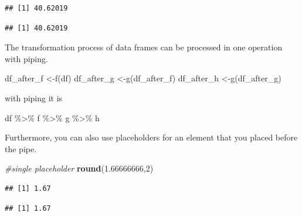 \documentclass[]{report}
\newenvironment{Shaded}{\begin{snugshade}}{\end{snugshade}}
\newcommand{\KeywordTok}[1]{\textcolor[rgb]{0.13,0.29,0.53}{\textbf{#1}}}
\newcommand{\DecValTok}[1]{\textcolor[rgb]{0.00,0.00,0.81}{#1}}
\newcommand{\FloatTok}[1]{\textcolor[rgb]{0.00,0.00,0.81}{#1}}
\newcommand{\StringTok}[1]{\textcolor[rgb]{0.31,0.60,0.02}{#1}}
\newcommand{\CommentTok}[1]{\textcolor[rgb]{0.56,0.35,0.01}{\textit{#1}}}
\newcommand{\OperatorTok}[1]{\textcolor[rgb]{0.81,0.36,0.00}{\textbf{#1}}}
\newcommand{\NormalTok}[1]{#1}
\begin{document}
\begin{verbatim}
## [1] 40.62019
\end{verbatim}

\begin{Shaded}
\end{Shaded}

\begin{verbatim}
## [1] 40.62019
\end{verbatim}

The transformation process of data frames can be processed in one
operation with piping.

df\_after\_f \textless{}-f(df) df\_after\_g \textless{}-g(df\_after\_f)
df\_after\_h \textless{}-g(df\_after\_g)

with piping it is

df \%\textgreater{}\% f \%\textgreater{}\% g \%\textgreater{}\% h

Furthermore, you can also use placeholders for an element that you
placed before the pipe.

\begin{Shaded}
\begin{Highlighting}[]
\CommentTok{#single placeholder}
\KeywordTok{round}\NormalTok{(}\FloatTok{1.66666666}\NormalTok{,}\DecValTok{2}\NormalTok{)}
\end{Highlighting}
\end{Shaded}

\begin{verbatim}
## [1] 1.67
\end{verbatim}

\begin{Shaded}
\end{Shaded}

\begin{verbatim}
## [1] 1.67
\end{verbatim}

\begin{Shaded}
\end{Shaded}
\end{document}

